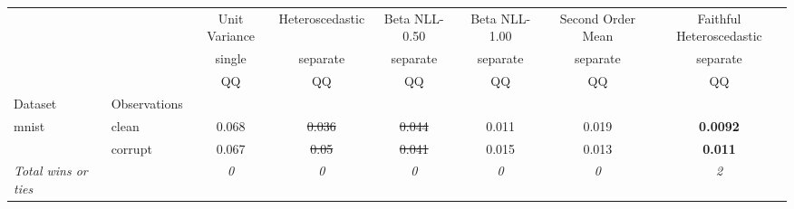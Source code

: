 \begin{tabular}{ll|c|c|c|c|c|c}
\toprule
{} & {} & {Unit Variance} & {Heteroscedastic} & {Beta NLL-0.50} & {Beta NLL-1.00} & {Second Order Mean} & {Faithful Heteroscedastic} \\
{} & {} & {single} & {separate} & {separate} & {separate} & {separate} & {separate} \\
{} & {} & {QQ} & {QQ} & {QQ} & {QQ} & {QQ} & {QQ} \\
{Dataset} & {Observations} & {} & {} & {} & {} & {} & {} \\
\midrule
\multirow[t]{2}{*}{mnist} & clean & 0.068 & \sout{0.036} & \sout{0.044} & 0.011 & 0.019 & \textbf{0.0092} \\
 & corrupt & 0.067 & \sout{0.05} & \sout{0.041} & 0.015 & 0.013 & \textbf{0.011} \\
\textit{{Total wins or ties}} &  & \textit{0} & \textit{0} & \textit{0} & \textit{0} & \textit{0} & \textit{2} \\
\bottomrule
\end{tabular}
